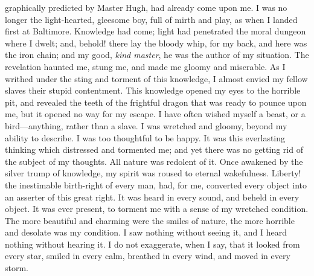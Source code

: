 graphically predicted by Master Hugh, had already come upon me. I was no
longer the light-hearted, gleesome boy, full of mirth and play, as when
I landed first at Baltimore. Knowledge had {}come; light had penetrated
the moral dungeon where I dwelt; and, behold! there lay the bloody whip,
for my back, and here was the iron chain; and my good, \emph{kind
master}, he was the author of my situation. The revelation haunted me,
stung me, and made me gloomy and miserable. As I writhed under the sting
and torment of this knowledge, I almost envied my fellow slaves their
stupid contentment. This knowledge opened my eyes to the horrible pit,
and revealed the teeth of the frightful dragon that was ready to pounce
upon me, but it opened no way for my escape. I have often wished myself
a beast, or a bird---anything, rather than a slave. I was wretched and
gloomy, beyond my ability to describe. I was too thoughtful to be happy.
It was this everlasting thinking which distressed and tormented me; and
yet there was no getting rid of the subject of my thoughts. All nature
was redolent of it. Once awakened by the silver trump of knowledge, my
spirit was roused to eternal wakefulness. Liberty! the inestimable
birth-right of every man, had, for me, converted every object into an
asserter of this great right. It was heard in every sound, and beheld in
every object. It was ever present, to torment me with a sense of my
wretched condition. The more beautiful and charming were the smiles of
nature, the more horrible and desolate was my condition. I saw nothing
without seeing it, and I heard nothing without hearing it. I do not
exaggerate, when I say, that it looked from every star, smiled in every
calm, breathed in every wind, and moved in every storm.

